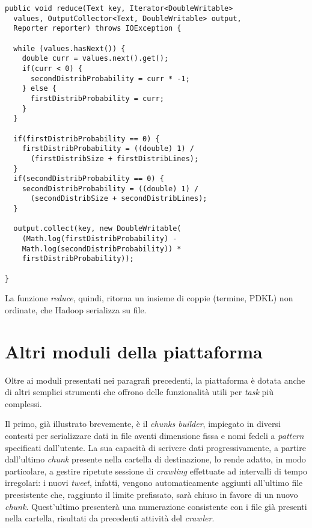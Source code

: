 \begin{lstlisting}[frame=single]
public void reduce(Text key, Iterator<DoubleWritable> 
  values, OutputCollector<Text, DoubleWritable> output, 
  Reporter reporter) throws IOException {
  
  while (values.hasNext()) {
    double curr = values.next().get();
    if(curr < 0) {
      secondDistribProbability = curr * -1;
    } else {
      firstDistribProbability = curr;
    }
  }
  
  if(firstDistribProbability == 0) {
    firstDistribProbability = ((double) 1) / 
      (firstDistribSize + firstDistribLines);
  }
  if(secondDistribProbability == 0) {
    secondDistribProbability = ((double) 1) / 
      (secondDistribSize + secondDistribLines);
  }
  
  output.collect(key, new DoubleWritable(
    (Math.log(firstDistribProbability) - 
    Math.log(secondDistribProbability)) * 
    firstDistribProbability));

}
\end{lstlisting}

La funzione \textit{reduce}, quindi, ritorna un insieme di coppie (termine, PDKL) non ordinate, che Hadoop serializza su file.

\section{Altri moduli della piattaforma}
\label{par:modules}

Oltre ai moduli presentati nei paragrafi precedenti, la piattaforma è dotata anche di altri semplici strumenti che offrono delle funzionalità utili per \textit{task} più complessi.

Il primo, già illustrato brevemente, è il \textit{chunks builder}, impiegato in diversi contesti per serializzare dati in file aventi dimensione fissa e nomi fedeli a \textit{pattern} specificati dall’utente. 
La sua capacità di scrivere dati progressivamente, a partire dall’ultimo \textit{chunk} presente nella cartella di destinazione, lo rende adatto, in modo particolare, a gestire ripetute sessione di \textit{crawling} 
effettuate ad intervalli di tempo irregolari: i nuovi \textit{tweet}, infatti, vengono automaticamente aggiunti all’ultimo file preesistente che, raggiunto il limite prefissato, sarà chiuso in favore di un nuovo \textit{chunk}. 
Quest’ultimo presenterà una numerazione consistente con i file già presenti nella cartella, risultati da precedenti attività del \textit{crawler}.

